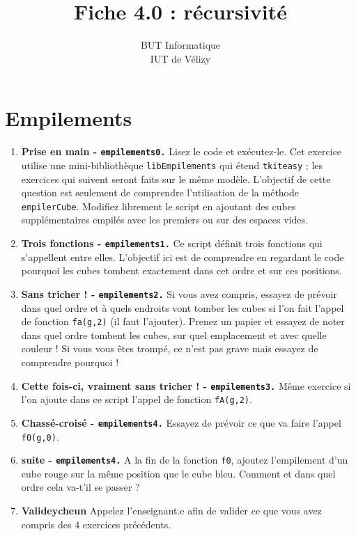 \documentclass[11pt,a4paper]{article}
\title{Fiche 4.0 : récursivité}
\author{BUT Informatique\\
IUT de Vélizy\\
}
\date{}
\newcommand{\checkbox}{$\square$ \smallskip}
\newcounter{exo} \setcounter{exo}{0}
\newenvironment{action}{%
    \begin{enumerate}[\numerotation] \addtocounter{exo}{-1}%
        }{%
    \end{enumerate}
}
\newcommand{\numexoa}{\theexo \addtocounter{exo}{1}}
\newcommand{\numerotation}{\checkbox \smallskip \numexoa.}
\begin{document}
\maketitle





\thispagestyle{empty}

\setcounter{section}{-1}
\section{Empilements}

\begin{action}
\item {\bf Prise en main - \tt empilements0.} Lisez le code et exécutez-le. Cet exercice utilise une mini-bibliothèque {\tt libEmpilements} 
qui étend {\tt tkiteasy} ; les exercices qui suivent seront faits sur le même modèle.
L'objectif de cette question est seulement de comprendre l'utilisation de la méthode {\tt empilerCube}. 
Modifiez librement le script en ajoutant des cubes supplémentaires empilés avec les premiers ou sur des espaces vides.
\item {\bf Trois fonctions - \tt empilements1.} Ce script définit trois fonctions qui s'appellent entre elles. L'objectif ici
est de comprendre en regardant le code pourquoi les cubes tombent exactement dans cet ordre et sur ces positions.
\item {\bf Sans tricher ! - \tt empilements2.} Si vous avez compris, essayez de prévoir 
dans quel ordre et à quels endroits vont tomber les cubes si l'on fait l'appel de fonction {\tt fa(g,2)} (il faut l'ajouter). Prenez un papier et essayez
de noter dans quel ordre tombent les cubes, sur quel emplacement et avec quelle couleur ! Si vous vous êtes trompé, 
ce n'est pas grave mais essayez de comprendre pourquoi !
\item {\bf Cette fois-ci, vraiment sans tricher ! - \tt empilements3.} Même exercice si l'on ajoute dans ce script l'appel de fonction {\tt fA(g,2)}.
\item {\bf Chassé-croisé - \tt empilements4.}  Essayez de prévoir ce que va faire l'appel {\tt f0(g,0)}.
\item {\bf suite - \tt empilements4.} A la fin de la fonction {\tt f0}, ajoutez l'empilement d'un cube rouge sur la même
position que le cube bleu. Comment et dans quel ordre cela va-t'il se passer ?
\item {\bf Valideycheun} Appelez l'enseignant.e afin de valider ce que vous avez compris des 4 exercices précédents.
\end{action}
\end{document}
